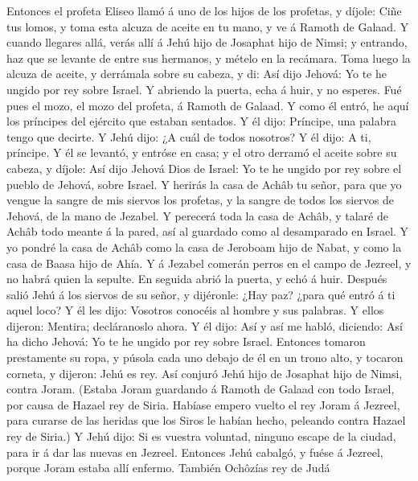  Entonces el profeta Eliseo llamó á uno de los hijos de
los profetas, y díjole: Ciñe tus lomos, y toma esta alcuza de aceite en
tu mano, y ve á Ramoth de Galaad.  Y cuando llegares allá,
verás allí á Jehú hijo de Josaphat hijo de Nimsi; y entrando, haz que se
levante de entre sus hermanos, y mételo en la recámara. 
Toma luego la alcuza de aceite, y derrámala sobre su cabeza, y di: Así
dijo Jehová: Yo te he ungido por rey sobre Israel. Y abriendo la puerta,
echa á huir, y no esperes.  Fué pues el mozo, el mozo del
profeta, á Ramoth de Galaad.  Y como él entró, he aquí los
príncipes del ejército que estaban sentados. Y él dijo: Príncipe, una
palabra tengo que decirte. Y Jehú dijo: ¿A cuál de todos nosotros? Y él
dijo: A ti, príncipe.  Y él se levantó, y entróse en casa;
y el otro derramó el aceite sobre su cabeza, y díjole: Así dijo Jehová
Dios de Israel: Yo te he ungido por rey sobre el pueblo de Jehová, sobre
Israel.  Y herirás la casa de Achâb tu señor, para que yo
vengue la sangre de mis siervos los profetas, y la sangre de todos los
siervos de Jehová, de la mano de Jezabel.  Y perecerá toda
la casa de Achâb, y talaré de Achâb todo meante á la pared, así al
guardado como al desamparado en Israel.  Y yo pondré la
casa de Achâb como la casa de Jeroboam hijo de Nabat, y como la casa de
Baasa hijo de Ahía.  Y á Jezabel comerán perros en el
campo de Jezreel, y no habrá quien la sepulte. En seguida abrió la
puerta, y echó á huir.  Después salió Jehú á los siervos
de su señor, y dijéronle: ¿Hay paz? ¿para qué entró á ti aquel loco? Y
él les dijo: Vosotros conocéis al hombre y sus palabras. 
Y ellos dijeron: Mentira; decláranoslo ahora. Y él dijo: Así y así me
habló, diciendo: Así ha dicho Jehová: Yo te he ungido por rey sobre
Israel.  Entonces tomaron prestamente su ropa, y púsola
cada uno debajo de él en un trono alto, y tocaron corneta, y dijeron:
Jehú es rey.  Así conjuró Jehú hijo de Josaphat hijo de
Nimsi, contra Joram. (Estaba Joram guardando á Ramoth de Galaad con todo
Israel, por causa de Hazael rey de Siria.  Habíase empero
vuelto el rey Joram á Jezreel, para curarse de las heridas que los Siros
le habían hecho, peleando contra Hazael rey de Siria.) Y Jehú dijo: Si
es vuestra voluntad, ninguno escape de la ciudad, para ir á dar las
nuevas en Jezreel.  Entonces Jehú cabalgó, y fuése á
Jezreel, porque Joram estaba allí enfermo. También Ochôzías rey de Judá
